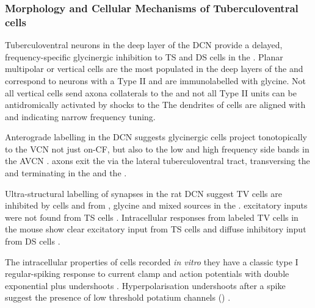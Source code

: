 

\subsubsection{Morphology and Cellular Mechanisms of Tuberculoventral cells}

Tuberculoventral neurons in the deep layer of the DCN provide a delayed,
frequency-specific glycinergic inhibition to TS and DS cells in the \VCN
\citep{ZhangOertel:1993,WickesbergOertel:1988}.  Planar multipolar or vertical
cells are the most populated in the deep layers of the \DCN and correspond to
neurons with a Type II \EIRA \citep{SpirouDavisEtAl:1999,Rhode:1999} and are
immunolabelled with glycine.  Not all vertical cells send axona collaterals to
the \VCN \citep{Rhode:1999} and not all Type II units can be antidromically
activated by shocks to the \VCN The dendrites of \TV cells are aligned with
\ANFs and indicating narrow frequency tuning.


Anterograde labelling in the DCN suggests glycinergic \TV cells project
tonotopically to the VCN not just on-CF, but also to the low and high frequency
side bands in the AVCN
\citep{WickesbergOertel:1993,WickesbergOertel:1988,WickesbergWhitlonEtAl:1991,Wickesberg:1996,OstapoffFengEtAl:1994,MunirathinamOstapoffEtAl:2004}.
\TV axons exit the \DCN via the lateral tuberculoventral tract, transversing the
\GCD and terminating in the \PVCN and the \AVCN.


Ultra-structural labelling of synapses in the rat DCN suggest TV cells are
inhibited by \DS cells and from \GABA, glycine and mixed sources in the \DCN \citep{RubioJuiz:2004}.  
excitatory inputs were not found from TS cells \citep{RubioJuiz:2004}.
Intracellular responses from labeled TV cells in the mouse show clear excitatory
input from TS cells and diffuse inhibitory input from DS cells
\citep{ZhangOertel:1993}.



The intracellular properties of \TV  cells  recorded \textit{in vitro} they have a classic type I regular-spiking response to current clamp and action potentials with double exponential plus undershoots
\citep{EvansNelson:1973,WickesbergOertel:1990,YoungBrownell:1976,YoungVoigt:1981,ZhangOertel:1993}.
Hyperpolarisation undershoots after a spike suggest the presence of low
threshold potatium channels (\IKLT) \citep{ManisMarx:1991,RothmanManis:2003}.



